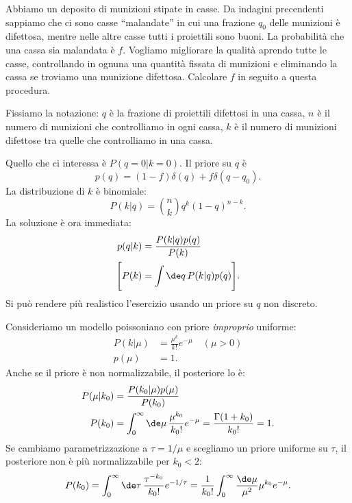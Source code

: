 \begin{exercise}
	Abbiamo un deposito di munizioni stipate in casse.
	Da indagini precendenti sappiamo che ci sono casse ``malandate''
	in cui una frazione $q_0$ delle munizioni è difettosa,
	mentre nelle altre casse tutti i proiettili sono buoni.
	La probabilità che una cassa sia malandata è $f$.
	Vogliamo migliorare la qualità aprendo tutte le casse,
	controllando in ognuna una quantità fissata di munizioni e
	eliminando la cassa se troviamo una munizione difettosa.
	Calcolare $f$ in seguito a questa procedura.
\end{exercise}

\begin{solution*}
	Fissiamo la notazione:
	$q$ è la frazione di proiettili difettosi in una cassa,
	$n$ è il numero di munizioni che controlliamo in ogni cassa,
	$k$ è il numero di munizioni difettose tra quelle che controlliamo in una cassa.
	
	Quello che ci interessa è $P(q=0|k=0)$.
	Il priore su $q$ è
	\begin{equation*}
		p(q) = (1-f) \delta(q) + f \delta(q-q_0).
	\end{equation*}
	La distribuzione di $k$ è binomiale:
	\begin{equation*}
		P(k|q) = \binom nk q^k (1-q)^{n-k}.
	\end{equation*}
	La soluzione è ora immediata:
	\begin{align*}
		p(q|k) &= \frac{P(k|q) p(q)}{P(k)} \\
		\Bigg[ P(k) &= \int \de q\, P(k|q) p(q) \Bigg].
	\end{align*}
	Si può rendere più realistico l'esercizio usando un priore su $q$ non discreto.
\end{solution*}


\begin{example}
	Consideriamo un modello poissoniano con priore \emph{improprio} uniforme:
	\begin{align*}
		P(k|\mu) &= \frac{\mu^k}{k!}e^{-\mu} \quad (\mu > 0) \\
		p(\mu) &= 1.
	\end{align*}
	Anche se il priore è non normalizzabile, il posteriore lo è:
	\begin{align*}
		P(\mu|k_0) &= \frac{P(k_0|\mu) p(\mu)}{P(k_0)} \\
		P(k_0) &= \int_0^\infty \de\mu\, \frac{\mu^{k_0}}{k_0!}e^{-\mu} = \frac{\Gamma(1+k_0)}{k_0!} = 1.
	\end{align*}
	Se cambiamo parametrizzazione a $\tau=1/\mu$ e scegliamo un priore uniforme su $\tau$,
	il posteriore non è più normalizzabile per $k_0<2$:
	\begin{equation*}
		P(k_0)
		= \int_0^\infty \de\tau\, \frac{\tau^{-k_0}}{k_0!}e^{-1/\tau}
		= \frac1{k_0!} \int_0^\infty \frac{\de\mu}{\mu^2} \mu^{k_0}e^{-\mu}.
	\end{equation*}
\end{example}
